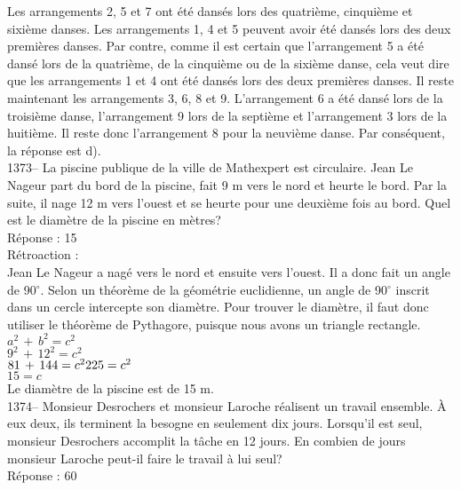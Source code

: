 ﻿\documentclass[letterpaper, 12pt]{article}
\begin{document}
Les arrangements 2, 5 et 7 ont \'et\'e dans\'es lors des quatri\`eme,
cinqui\`eme et sixi\`eme danses.  Les arrangements 1, 4 et 5 peuvent avoir
\'et\'e dans\'es lors des deux premi\`eres danses.  Par contre, comme il est
certain que l'arrangement 5 a \'et\'e dans\'e lors de la quatri\`eme, de la
cinqui\`eme ou de la sixi\`eme danse, cela veut dire que les arrangements 1
et 4 ont \'et\'e dans\'es lors des deux premi\`eres danses.  Il reste
maintenant les arrangements 3, 6, 8 et 9.  L'arrangement 6 a \'et\'e dans\'e
lors de la troisi\`eme danse, l'arrangement 9 lors de la septi\`eme et
l'arrangement 3 lors de la huiti\`eme.  Il reste donc l'arrangement 8 pour
la neuvi\`eme danse.  Par cons\'equent, la r\'eponse est d).\\

1373-- La piscine publique de la ville de Mathexpert est circulaire.
Jean Le Nageur part du bord de la piscine, fait 9 m vers le nord et
heurte le bord.  Par la suite, il nage 12 m vers l'ouest
et se heurte pour une deuxi\`eme fois au bord.  Quel est le diam\`etre de la
piscine en m\`etres?\\

R\'eponse : 15\\

R\'etroaction : \\
Jean Le Nageur a nag\'e vers le nord et ensuite vers l'ouest.  Il a donc
fait un angle de 90$^{\circ}$.  Selon un th\'eor\`eme de la g\'eom\'etrie
euclidienne, un angle de 90$^{\circ}$ inscrit dans un cercle intercepte son
diam\`etre.  Pour trouver le diam\`etre, il faut donc utiliser le
th\'eor\`eme de Pythagore, puisque nous avons un triangle rectangle.  \\
$a^{2}\,+\,b^{2}=c^{2}$\\
$9^{2}\,+\,12^{2}=c^{2}$\\
$81\,+\,144=c^{2}\\
225=c^{2}$\\
$15=c$\\
Le diam\`etre de la piscine est de 15 m.\\

1374-- Monsieur Desrochers et monsieur Laroche r\'ealisent un travail
ensemble.  \`A eux deux, ils terminent la besogne en seulement dix jours.
Lorsqu'il est seul, monsieur Desrochers accomplit la t\^ache en 12 jours.
En combien de jours monsieur Laroche peut-il faire le travail \`a lui
seul?\\

R\'eponse : 60\\
\end{document}
